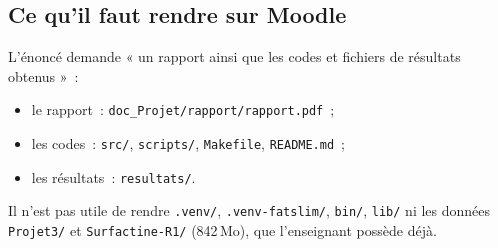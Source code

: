 \documentclass[11pt,a4paper]{article}
\newcommand{\f}[1]{\texttt{#1}}
\begin{document}
\subsection{Ce qu'il faut rendre sur Moodle}
L'énoncé demande « un rapport ainsi que les codes et fichiers de résultats obtenus »~:
\begin{itemize}
\item le rapport~: \f{doc\_Projet/rapport/rapport.pdf}~;
\item les codes~: \f{src/}, \f{scripts/}, \f{Makefile}, \f{README.md}~;
\item les résultats~: \f{resultats/}.
\end{itemize}
Il n'est pas utile de rendre \f{.venv/}, \f{.venv-fatslim/}, \f{bin/}, \f{lib/} ni les données \f{Projet3/} et
\f{Surfactine-R1/} (842\,Mo), que l'enseignant possède déjà.
\end{document}
